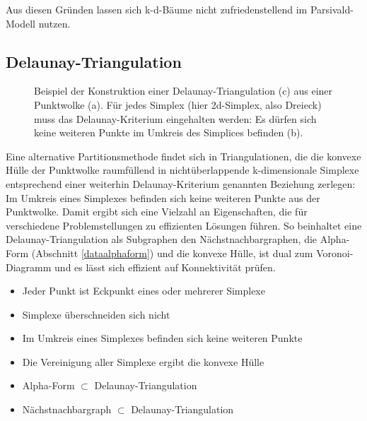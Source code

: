 Aus diesen Gründen lassen sich k-d-Bäume nicht zufriedenstellend im Parsivald-Modell nutzen.

\subsection{Delaunay-Triangulation}
\label{datadelaunay}

\begin{figure}
  \centering
  \def\svgwidth{\textwidth}
  
  \caption[Delaunay-Triangulation]{Beispiel der Konstruktion einer Delaunay-Triangulation (c) aus einer Punktwolke (a).
    Für jedes Simplex (hier 2d-Simplex, also Dreieck) muss das Delaunay-Kriterium eingehalten werden:
    Es dürfen sich keine weiteren Punkte im Umkreis des Simplices befinden (b).
  }
  \label{fig:delaunay}
\end{figure}

Eine alternative Partitionsmethode findet sich in Triangulationen, die die konvexe Hülle der Punktwolke raumfüllend in nichtüberlappende k-dimensionale Simplexe entsprechend einer weiterhin Delaunay-Kriterium genannten Beziehung zerlegen:
Im Umkreis eines Simplexes befinden sich keine weiteren Punkte aus der Punktwolke.
Damit ergibt sich eine Vielzahl an Eigenschaften, die für verschiedene Problemstellungen zu effizienten Lösungen führen.
So beinhaltet eine Delaunay-Triangulation als Subgraphen den Nächstnachbargraphen, die Alpha-Form (Abschnitt \ref{dataalphaform}) und die konvexe Hülle, ist dual zum Voronoi-Diagramm und es lässt sich effizient auf Konnektivität prüfen.

\begin{itemize}
\item Jeder Punkt ist Eckpunkt eines oder mehrerer Simplexe
\item Simplexe überschneiden sich nicht
\item Im Umkreis eines Simplexes befinden sich keine weiteren Punkte
\item Die Vereinigung aller Simplexe ergibt die konvexe Hülle
\item Alpha-Form $\subset$ Delaunay-Triangulation
\item %
  Nächstnachbargraph $\subset$ Delaunay-Triangulation
\end{itemize}

